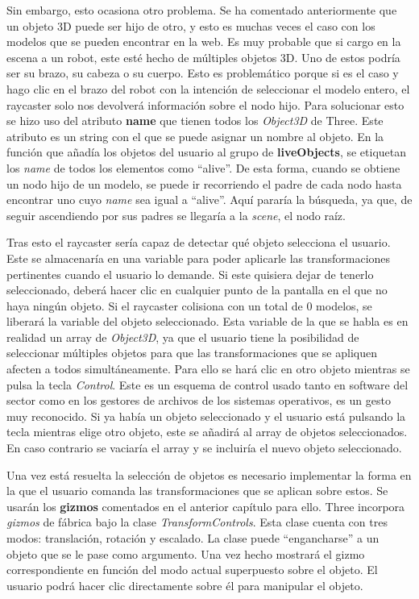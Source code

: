Sin embargo, esto ocasiona otro problema. Se ha comentado anteriormente que un objeto 3D puede ser hijo de otro, y esto es muchas veces el caso con los modelos que se pueden encontrar en la web. Es muy probable que si cargo en la escena a un robot, este esté hecho de múltiples objetos 3D. Uno de estos podría ser su brazo, su cabeza o su cuerpo. Esto es problemático porque si es el caso y hago clic en el brazo del robot con la intención de seleccionar el modelo entero, el raycaster solo nos devolverá información sobre el nodo hijo. Para solucionar esto se hizo uso del atributo \textbf{name} que tienen todos los \textit{Object3D} de Three. Este atributo es un string con el que se puede asignar un nombre al objeto. En la función que añadía los objetos del usuario al grupo de \textbf{liveObjects}, se etiquetan los \textit{name} de todos los elementos como ``alive''. De esta forma, cuando se obtiene un nodo hijo de un modelo, se puede ir recorriendo el padre de cada nodo hasta encontrar uno cuyo \textit{name} sea igual a ``alive''. Aquí pararía la búsqueda, ya que, de seguir ascendiendo por sus padres se llegaría a la \textit{scene}, el nodo raíz.

Tras esto el raycaster sería capaz de detectar qué objeto selecciona el usuario. Este se almacenaría en una variable para poder aplicarle las transformaciones pertinentes cuando el usuario lo demande. Si este quisiera dejar de tenerlo seleccionado, deberá hacer clic en cualquier punto de la pantalla en el que no haya ningún objeto. Si el raycaster colisiona con un total de 0 modelos, se liberará la variable del objeto seleccionado. Esta variable de la que se habla es en realidad un array de \textit{Object3D}, ya que el usuario tiene la posibilidad de seleccionar múltiples objetos para que las transformaciones que se apliquen afecten a todos simultáneamente. Para ello se hará clic en otro objeto mientras se pulsa la tecla \textit{Control}. Este es un esquema de control usado tanto en software del sector como en los gestores de archivos de los sistemas operativos, es un gesto muy reconocido. Si ya había un objeto seleccionado y el usuario está pulsando la tecla mientras elige otro objeto, este se añadirá al array de objetos seleccionados. En caso contrario se vaciaría el array y se incluiría el nuevo objeto seleccionado.

Una vez está resuelta la selección de objetos es necesario implementar la forma en la que el usuario comanda las transformaciones que se aplican sobre estos. Se usarán los \textbf{gizmos} comentados en el anterior capítulo para ello. Three incorpora \textit{gizmos} de fábrica bajo la clase \textit{TransformControls}. Esta clase cuenta con tres modos: translación, rotación y escalado. La clase puede ``engancharse'' a un objeto que se le pase como argumento. Una vez hecho mostrará el gizmo correspondiente en función del modo actual superpuesto sobre el objeto. El usuario podrá hacer clic directamente sobre él para manipular el objeto.

